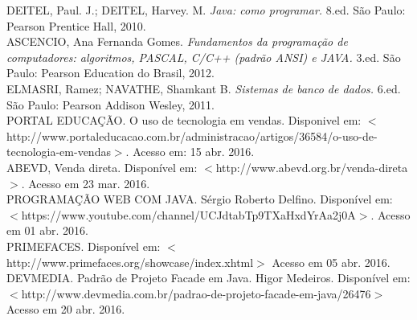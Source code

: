 \documentclass[chapter=TITLE,12pt,oneside,a4paper,english,french,sumario=tradicional,spanish,brazil,]{abntex2}
\begin{document}
\begin{thebibliography}{99}
DEITEL, Paul. J.; DEITEL, Harvey. M. {\em Java: como programar.} 8.ed. São Paulo: Pearson Prentice Hall, 2010.
\\[0,4cm]


ASCENCIO, Ana Fernanda Gomes. {\em Fundamentos da programação de computadores: algoritmos,
PASCAL, C/C++ (padrão ANSI) e JAVA.} 3.ed. São Paulo: Pearson Education do Brasil, 2012.
\\[0,4cm]


ELMASRI, Ramez; NAVATHE, Shamkant B. {\em Sistemas de banco de dados.} 6.ed. São Paulo: Pearson Addison Wesley, 2011.
\\[0,4cm]


PORTAL EDUCAÇÃO. {O uso de tecnologia em vendas}. Disponivel em: $<$http://www.portaleducacao.com.br/administracao/artigos/36584/o-uso-de-tecnologia-em-vendas$>$. Acesso em: 15 abr. 2016.
\\[0,4cm]

ABEVD, Venda direta. Disponível em: $<$http://www.abevd.org.br/venda-direta$>$. Acesso em  23 mar. 2016.
\\[0,4cm]

PROGRAMAÇÃO WEB COM JAVA. Sérgio Roberto Delfino. Disponível em: $<$https://www.youtube.com/channel/UCJdtabTp9TXaHxdYrAa2j0A$>$. Acesso em  01 abr. 2016.
\\[0,4cm]

PRIMEFACES. Disponível em: $<$http://www.primefaces.org/showcase/index.xhtml$>$ Acesso em  05 abr. 2016.
\\[0,4cm]


DEVMEDIA. Padrão de Projeto Facade em Java. Higor Medeiros. Disponível em: $<$http://www.devmedia.com.br/padrao-de-projeto-facade-em-java/26476$>$ Acesso em  20 abr. 2016.
\\[0,4cm]


\end{thebibliography}
\end{document}
